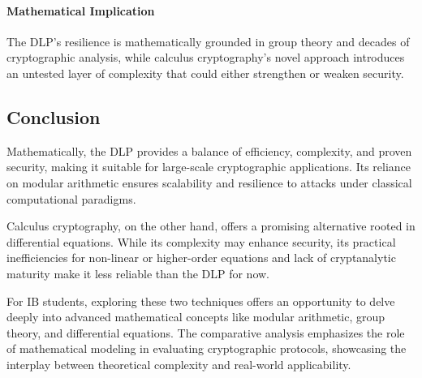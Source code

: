 \documentclass[12pt]{article}
\begin{document}
\paragraph*{Mathematical Implication}
The DLP’s resilience is mathematically grounded in group theory and decades of cryptographic analysis, while calculus cryptography’s novel approach introduces an untested layer of complexity that could either strengthen or weaken security.

\subsection*{Conclusion}

Mathematically, the DLP provides a balance of efficiency, complexity, and proven security, making it suitable for large-scale cryptographic applications. Its reliance on modular arithmetic ensures scalability and resilience to attacks under classical computational paradigms.

Calculus cryptography, on the other hand, offers a promising alternative rooted in differential equations. While its complexity may enhance security, its practical inefficiencies for non-linear or higher-order equations and lack of cryptanalytic maturity make it less reliable than the DLP for now.

For IB students, exploring these two techniques offers an opportunity to delve deeply into advanced mathematical concepts like modular arithmetic, group theory, and differential equations. The comparative analysis emphasizes the role of mathematical modeling in evaluating cryptographic protocols, showcasing the interplay between theoretical complexity and real-world applicability.




\newpage
\end{document}
